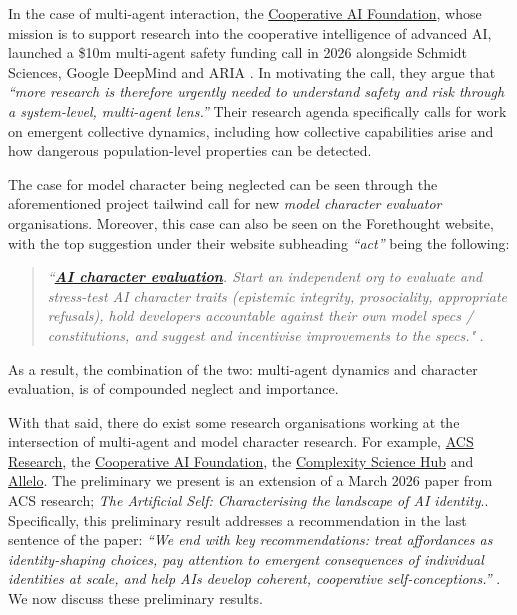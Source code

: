 \documentclass[11pt,a4paper]{article}
\begin{document}
In the case of multi-agent interaction, the \href{https://www.cooperativeai.com/foundation#Mission}{Cooperative AI Foundation}, whose mission is to support research into the cooperative intelligence of advanced AI, launched a \$10m multi-agent safety funding call in 2026 alongside Schmidt Sciences, Google DeepMind and ARIA \cite{cooperativeai2026multiagentsafety}. In motivating the call, they argue that \textit{``more research is therefore urgently needed to understand safety and risk through a system-level, multi-agent lens.''} Their research agenda specifically calls for work on emergent collective dynamics, including how collective capabilities arise and how dangerous population-level properties can be detected.

The case for model character being neglected can be seen through the aforementioned project tailwind call for new \textit{model character evaluator} organisations. Moreover, this case can also be seen on the Forethought website, with the top suggestion under their website subheading \emph{``act''} being the following:

\begin{quote}
\emph{``\href{https://www.forethought.org/research/concrete-projects-in-agi-preparedness\#ai-character-evaluation}{\textbf{AI character evaluation}}. Start an independent org to evaluate and stress-test AI character traits (epistemic integrity, prosociality, appropriate refusals), hold developers accountable against their own model specs / constitutions, and suggest and incentivise improvements to the specs."} \cite{macaskill2026concrete}.
\label{Act}
\end{quote}

As a result, the combination of the two: multi-agent dynamics and character evaluation, is of compounded neglect and importance.

With that said, there do exist some research organisations working at the intersection of multi-agent and model character research. For example, \href{https://acsresearch.org/about}{ACS Research}, the \href{https://www.cooperativeai.com/foundation#Mission}{Cooperative AI Foundation}, the \href{https://csh.ac.at/research/research-topic/ai-and-machine-learning/}{Complexity Science Hub} and \href{https://allelo.ai/}{Allelo}. The preliminary we present is an extension of a March 2026 paper from ACS research; \textit{The Artificial Self: Characterising the landscape of AI identity}.\cite{douglas2026artificialselfcharacterisinglandscape}. Specifically, this preliminary result addresses a recommendation in the last sentence of the paper: \emph{``We end with key recommendations: treat affordances as identity-shaping choices, pay attention to emergent consequences of individual identities at scale, and help AIs develop coherent, cooperative self-conceptions.''} \cite{douglas2026artificialselfcharacterisinglandscape}. We now discuss these preliminary results. 
\end{document}
